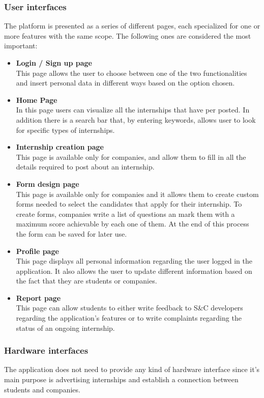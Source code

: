 \documentclass[11pt,twoside]{article}
\begin{document}
		\subsubsection{User interfaces}
The platform is presented as a series of different pages, each specialized for one or more features with the same scope. The following ones are considered the most important:
\begin{itemize}
\item \textbf{Login / Sign up page} \\
This page allows the user to choose between one of the two functionalities and insert personal data in different ways based on the option chosen.
\item \textbf{Home Page} \\
In this page users can visualize all the internships that have per posted. In addition there is a search bar that, by entering keywords, allows user to look for specific types of internships.
\item \textbf{Internship creation page} \\
This page is available only for companies, and allow them to fill in all the details required to post about an internship.
\item \textbf{Form design page} \\
This page is available only for companies and it allows them to create custom forms needed to select the candidates that apply for their internship. To create forms, companies write a list of questions an mark them with a maximum score achievable by each one of them. At the end of this process the form can be saved for later use.
\item \textbf{Profile page} \\
This page displays all personal information regarding the user logged in the application. It also allows the user to update different information based on the fact that they are students or companies.
\item \textbf{Report page} \\
This page can allow students to either write feedback to S\&C developers regarding the application's features or to write complaints regarding the status of an ongoing internship.
\end{itemize}
		\subsubsection{Hardware interfaces}
The application does not need to provide any kind of hardware interface since it's main purpose is advertising internships and establish a connection between students and companies.
\end{document}
